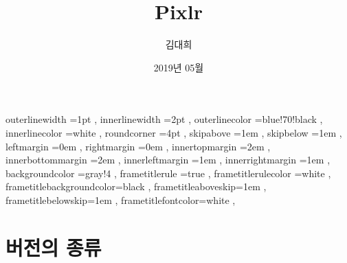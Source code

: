 \documentclass[12pt, a4paper, oneside]{book}
\begin{document}
	
			\dominitoc
			\doparttoc			




			\title{Pixlr}
			\author{김대희}
			\date{2019년 05월}
			\maketitle


			\tableofcontents 		%

			\cleardoublepage
			\listoffigures 			%

			\cleardoublepage
			\listoftables 			%





		 {
						outerlinewidth		=1pt			,%
						innerlinewidth		=2pt			,%
						outerlinecolor		=blue!70!black	,%
						innerlinecolor		=white 			,%
						roundcorner			=4pt			,%
						skipabove			=1em 			,%
						skipbelow			=1em 			,%
						leftmargin			=0em			,%
						rightmargin			=0em			,%
						innertopmargin		=2em 			,%
						innerbottommargin 	=2em 			,%
						innerleftmargin		=1em 			,%
						innerrightmargin		=1em 			,%
						backgroundcolor		=gray!4			,%
						frametitlerule		=true 			,%
						frametitlerulecolor	=white			,%
						frametitlebackgroundcolor=black		,%
						frametitleaboveskip=1em 			,%
						frametitlebelowskip=1em 			,%
						frametitlefontcolor=white 			,%
						}









	\chapter{버전의 종류} 
	\noptcrule
	\newpage
	\minitoc				


\end{document}
